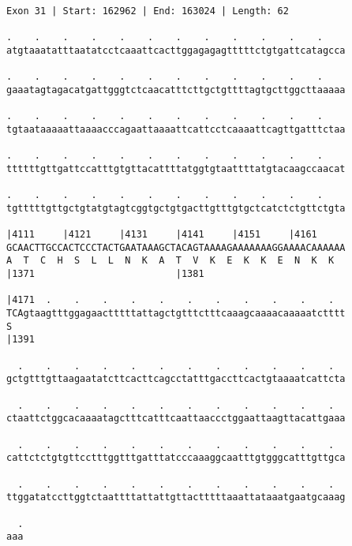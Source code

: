 \documentclass{article}
\begin{document}
\begin{Verbatim}
Exon 31 | Start: 162962 | End: 163024 | Length: 62
 
.    .    .    .    .    .    .    .    .    .    .    .    
atgtaaatatttaatatcctcaaattcacttggagagagtttttctgtgattcatagcca
  
.    .    .    .    .    .    .    .    .    .    .    .    
gaaatagtagacatgattgggtctcaacatttcttgctgttttagtgcttggcttaaaaa
  
.    .    .    .    .    .    .    .    .    .    .    .    
tgtaataaaaattaaaacccagaattaaaattcattcctcaaaattcagttgatttctaa
  
.    .    .    .    .    .    .    .    .    .    .    .    
ttttttgttgattccatttgtgttacattttatggtgtaattttatgtacaagccaacat
  
.    .    .    .    .    .    .    .    .    .    .    .    
tgtttttgttgctgtatgtagtcggtgctgtgacttgtttgtgctcatctctgttctgta
  
|4111     |4121     |4131     |4141     |4151     |4161     
GCAACTTGCCACTCCCTACTGAATAAAGCTACAGTAAAAGAAAAAAAGGAAAACAAAAAA
A  T  C  H  S  L  L  N  K  A  T  V  K  E  K  K  E  N  K  K  
|1371                         |1381                         
  
|4171  .    .    .    .    .    .    .    .    .    .    .  
TCAgtaagtttggagaactttttattagctgtttctttcaaagcaaaacaaaaatctttt
S                                                           
|1391                                                       
  
  .    .    .    .    .    .    .    .    .    .    .    .  
gctgtttgttaagaatatcttcacttcagcctatttgaccttcactgtaaaatcattcta
  
  .    .    .    .    .    .    .    .    .    .    .    .  
ctaattctggcacaaaatagctttcatttcaattaaccctggaattaagttacattgaaa
  
  .    .    .    .    .    .    .    .    .    .    .    .  
cattctctgtgttcctttggtttgatttatcccaaaggcaatttgtgggcatttgttgca
  
  .    .    .    .    .    .    .    .    .    .    .    .  
ttggatatccttggtctaattttattattgttactttttaaattataaatgaatgcaaag
  
  .
aaa
\end{Verbatim}
\newpage
\end{document}
